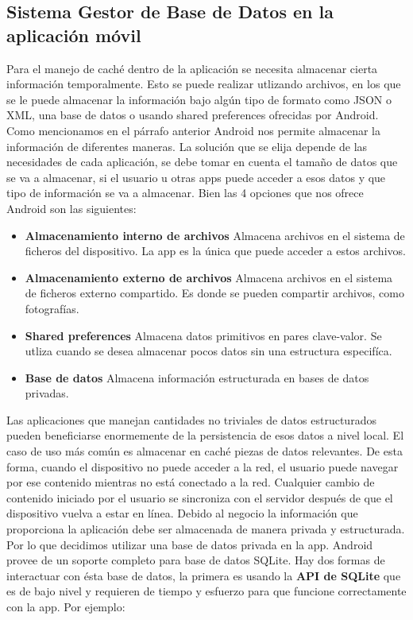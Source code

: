 \subsection{Sistema Gestor de Base de Datos en la aplicación móvil}
Para el manejo de caché dentro de la aplicación se necesita almacenar cierta información temporalmente. Esto se puede realizar utlizando archivos, en los que se le puede almacenar la información bajo algún tipo de formato como JSON o XML, una base de datos o usando shared preferences ofrecidas por Android.
Como mencionamos en el párrafo anterior Android nos permite almacenar la información de diferentes maneras. La solución que se elija depende de las necesidades de cada aplicación, se debe tomar en cuenta el tamaño de datos que se va a almacenar, si el usuario u otras apps puede acceder a esos datos y que tipo de información se va a almacenar. Bien las 4 opciones que nos ofrece Android son las siguientes:
\begin{itemize}
	\item \textbf{Almacenamiento interno de archivos} Almacena archivos en el sistema de ficheros del dispositivo. La app es la única que puede acceder a estos archivos.
	\item \textbf{Almacenamiento externo de archivos} Almacena archivos en el sistema de ficheros externo compartido. Es donde se pueden compartir archivos, como fotografías.
	\item \textbf{Shared preferences} Almacena datos primitivos en pares clave-valor. Se utliza cuando se desea almacenar pocos datos sin una estructura especifíca.
	\item \textbf{Base de datos} Almacena información estructurada en bases de datos privadas.
\end{itemize}
Las aplicaciones que manejan cantidades no triviales de datos estructurados pueden beneficiarse enormemente de la persistencia de esos datos a nivel local. El caso de uso más común es almacenar en caché piezas de datos relevantes. De esta forma, cuando el dispositivo no puede acceder a la red, el usuario puede navegar por ese contenido mientras no está conectado a la red. Cualquier cambio de contenido iniciado por el usuario se sincroniza con el servidor después de que el dispositivo vuelva a estar en línea.\cite{ROOM}
Debido al negocio la información que proporciona la aplicación debe ser almacenada de manera privada y estructurada. Por lo que decidimos utilizar una base de datos privada en la app.
Android provee de un soporte completo para base de datos SQLite. Hay dos formas de interactuar con ésta base de datos, la primera es usando la \textbf{API de SQLite} que es de bajo nivel y requieren de tiempo y esfuerzo para que funcione correctamente con la app. Por ejemplo:
